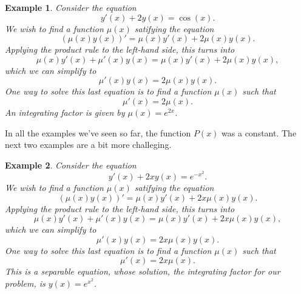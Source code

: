 \documentclass[11pt]{amsart}
\newtheorem{example}{Example}[section]
\numberwithin{equation}{section}
\begin{document}
\begin{example}
Consider the equation
\begin{equation}
\label{example3}
y'(x)+2y(x)=\cos(x).
\end{equation}
We wish to find a function $\mu(x)$ satifying the equation
\begin{equation*}
(\mu(x) y(x))'= \mu(x)y'(x)+2\mu(x)y(x).
\end{equation*}
Applying the product rule to the left-hand side, this turns into
\begin{equation*}
\mu(x)y'(x)+\mu'(x)y(x)= \mu(x)y'(x) + 2\mu(x)y(x),
\end{equation*}
which we can simplify to 
\begin{equation*}
\mu'(x)y(x)=2\mu(x)y(x).
\end{equation*}
One way to solve this last equation is to find a function $\mu(x)$ such that 
\begin{equation*}
\mu'(x)=2\mu(x).
\end{equation*}
An integrating factor is given by $\mu(x)=e^{2x}$. 
\end{example}

In all the examples we've seen so far, the function $P(x)$ was a constant. The next two examples are a bit more challeging. 

\begin{example}
Consider the equation
\begin{equation}
\label{example4}
y'(x)+2xy(x)=e^{-x^2}.
\end{equation}
We wish to find a function $\mu(x)$ satifying the equation
\begin{equation*}
(\mu(x) y(x))'= \mu(x)y'(x)+2x\mu(x)y(x).
\end{equation*}
Applying the product rule to the left-hand side, this turns into
\begin{equation*}
\mu(x)y'(x)+\mu'(x)y(x)= \mu(x)y'(x) + 2x\mu(x)y(x),
\end{equation*}
which we can simplify to 
\begin{equation*}
\mu'(x)y(x)=2x\mu(x)y(x).
\end{equation*}
One way to solve this last equation is to find a function $\mu(x)$ such that 
\begin{equation*}
\mu'(x)=2x\mu(x).
\end{equation*}
This is a separable equation, whose solution, the integrating factor for our problem, is $y(x)=e^{x^2}$.
\end{example}
\end{document}
